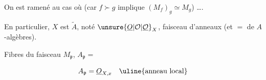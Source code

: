 On est ramené au cas où   (car  $f\succ g$ implique $(M_f)_g\simeq M_g$) \ldots.

En particulier, $X$ est  $\widetilde A$, noté $\unsure{\underline O|\mathcal O|\underline{\mathcal O}}_X$, faisceau  d'anneaux (et $=$ de $A$-algèbres).

Fibres du faisceau $M_{\mathfrak p}$, $A_{\mathfrak p}=$

\[
A_{\mathfrak p}=\underline O_{X,x}\quad\text{\uline{anneau local}}
\]

\margin{[$S\subset A$ stable par multiplication donc filtrant pour \deleted{\unsure{\prec}} $\succ$ donc $MS^{-1}=\varinjlim_{f\in S}M_f=\{\frac{x}{f^n}$ \unsure{avec} règles de calcul \ldots.]}

